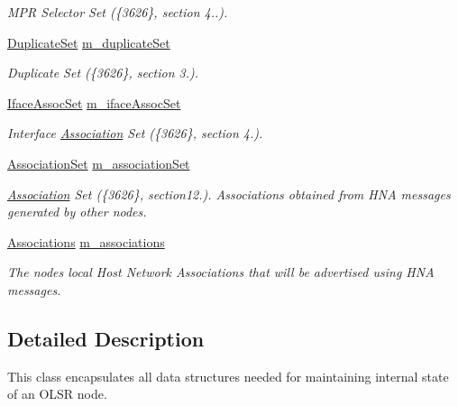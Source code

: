 \begin{DoxyCompactItemize}
\begin{DoxyCompactList}\small\item\em M\+PR Selector Set (\{3626\}, section 4..). \end{DoxyCompactList}\item 
\hyperlink{namespacens3_1_1olsr_aef00689fee8c925dd464c5d1fee0dee9}{Duplicate\+Set} \hyperlink{classns3_1_1olsr_1_1OlsrState_a6018482bbd79fb70432f35646f9e4b7a}{m\+\_\+duplicate\+Set}
\begin{DoxyCompactList}\small\item\em Duplicate Set (\{3626\}, section 3.). \end{DoxyCompactList}\item 
\hyperlink{namespacens3_1_1olsr_af7456b9ea2cde8c7d88443de06c015f4}{Iface\+Assoc\+Set} \hyperlink{classns3_1_1olsr_1_1OlsrState_a61e08ee7e0df39a4cb475e1c92f66b77}{m\+\_\+iface\+Assoc\+Set}
\begin{DoxyCompactList}\small\item\em Interface \hyperlink{structns3_1_1olsr_1_1Association}{Association} Set (\{3626\}, section 4.). \end{DoxyCompactList}\item 
\hyperlink{namespacens3_1_1olsr_a35c0d7e5a941dd49e212f0c9e81ba466}{Association\+Set} \hyperlink{classns3_1_1olsr_1_1OlsrState_a12b0716565d62abb059d75b67558a06c}{m\+\_\+association\+Set}
\begin{DoxyCompactList}\small\item\em \hyperlink{structns3_1_1olsr_1_1Association}{Association} Set (\{3626\}, section12.). Associations obtained from H\+NA messages generated by other nodes. \end{DoxyCompactList}\item 
\hyperlink{namespacens3_1_1olsr_a7aefab4ffae5b289262125647510a2ef}{Associations} \hyperlink{classns3_1_1olsr_1_1OlsrState_a7af273b4e3d168740e314b4894caef6f}{m\+\_\+associations}
\begin{DoxyCompactList}\small\item\em The node\textquotesingle{}s local Host Network Associations that will be advertised using H\+NA messages. \end{DoxyCompactList}\end{DoxyCompactItemize}


\subsection{Detailed Description}
This class encapsulates all data structures needed for maintaining internal state of an O\+L\+SR node. 

